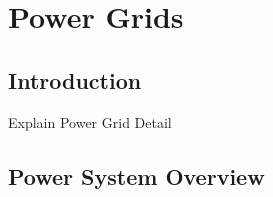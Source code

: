 
\chapter{Power Grids}


\section{Introduction}
Explain Power Grid Detail

\section{Power System Overview}








